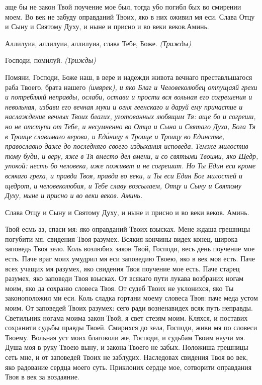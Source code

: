 аще бы не закон Твой поучение мое был, тогда убо погибл бых во
смирении моем. Во век не забуду оправданий Твоих, яко в них оживил мя
еси.
Слава Отцу и Сыну и Святому Духу, и ныне и присно и во веки веков.Аминь.

   Аллилуиа, аллилуиа, аллилуиа, слава Тебе, Боже. \itshape (Трижды)\normalfont{}


   Господи, помилуй. \itshape (Трижды)\normalfont{}


   Помяни, Господи, Боже наш, в вере и надежди живота вечнаго преставльшагося
раба Твоего, брата нашего \itshape (имярек)\normalfont{}, и яко Благ и Человеколюбец отпущаяй
грехи и потребляяй неправды, ослаби, остави и прости вся вольная его
согрешения и невольная, избави его вечная муки и огня геенскаго и даруй ему
причастие и наслаждение вечных Твоих благих, уготованных любящим Тя:
аще бо и согреши, но не отступи от Тебе, и несумненно во Отца и Сына и
Святаго Духа, Бога Тя в Троице славимаго верова, и Еди́ницу в Троице и
Троицу во Единстве, православно даже до последняго своего издыхания
исповеда. Темже милостив тому буди, и веру, яже в Тя вместо дел вмени, и со
святыми Твоими, яко Щедр, упокой: несть бо человека, иже поживет и не
согрешит. Но Ты Един еси кроме всякаго греха, и правда Твоя, правда во веки,
и Ты еси Един Бог милостей и щедрот, и человеколюбия, и Тебе славу
возсылаем, Отцу и Сыну и Святому Духу, ныне и присно и во веки веков.
Аминь.


   Слава Отцу и Сыну и Святому Духу, и ныне и присно и во веки веков.
Аминь.

   Твой есмь аз, спаси мя: яко оправданий Твоих взысках. Мене ждаша
грешницы погубити мя, свидения Твоя разумех. Всякия кончины видех
конец, широка заповедь Твоя зело. Коль возлюбих закон Твой, Господи, весь
день поучение мое есть. Паче враг моих умудрил мя еси заповедию Твоею,
яко в век моя есть. Паче всех учащих мя разумех, яко свидения Твоя
поучение мое есть. Паче старец разумех, яко заповеди Твоя взысках. От
всякаго пути лукава возбраних ногам моим, яко да сохраню словеса Твоя. От
судеб Твоих не уклонихся, яко Ты законоположил ми еси. Коль сладка
гортани моему словеса Твоя: паче меда устом моим. От заповедей Твоих
разумех: сего ради возненавидех всяк путь неправды. Светильник ногама
моима закон Твой, я свет стезям моим. Кляхся, и поставих сохранити
судьбы правды Твоей. Смирихся до зела, Господи, живи мя по словеси
Твоему. Вольная уст моих благоволи же, Господи, и судьбам Твоим
научи мя. Душа моя в руку Твоею выну, и закона Твоего не забых.
Положиша грешницы сеть мне, и от заповедей Твоих не заблудих.
Наследовах свидения Твоя во век, яко радование сердца моего суть.
Приклоних сердце мое, сотворити оправдания Твоя в век за воздаяние.


